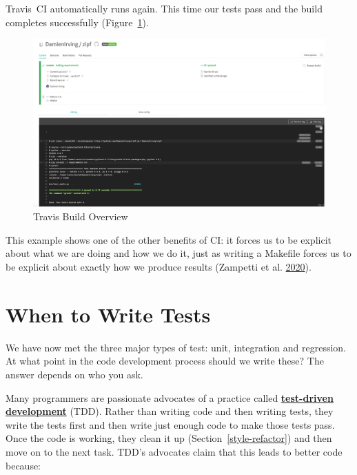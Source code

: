 \documentclass[
]{krantz}
\newcommand{\gref}[2]{\hyperlink{#2}{\textbf{#1}}}
\begin{document}
Travis~CI automatically runs again.
This time our tests pass and the build completes successfully
(Figure~\ref{fig:testing-build-pass}).

\begin{figure}

{\centering \includegraphics[width=1\linewidth]{figures/testing/travis-build-pass} 

}

\caption{Travis Build Overview}\label{fig:testing-build-pass}
\end{figure}

This example shows one of the other benefits of CI:
it forces us to be explicit about what we are doing and how we do it,
just as writing a Makefile forces us to be explicit about exactly how we produce results (Zampetti et al. \protect\hyperlink{ref-Zamp2020}{2020}).

\hypertarget{testing-tdd}{%
\section{When to Write Tests}\label{testing-tdd}}

We have now met the three major types of test: unit, integration and regression.
At what point in the code development process should we write these?
The answer depends on who you ask.

Many programmers are passionate advocates of a practice called
\gref{test-driven development}{tdd}
(TDD).
Rather than writing code and then writing tests,
they write the tests first and then write just enough code to make those tests pass.
Once the code is working,
they clean it up (Section~\ref{style-refactor}) and then move on to the next task.
TDD's advocates claim that this leads to better code because:
\end{document}
